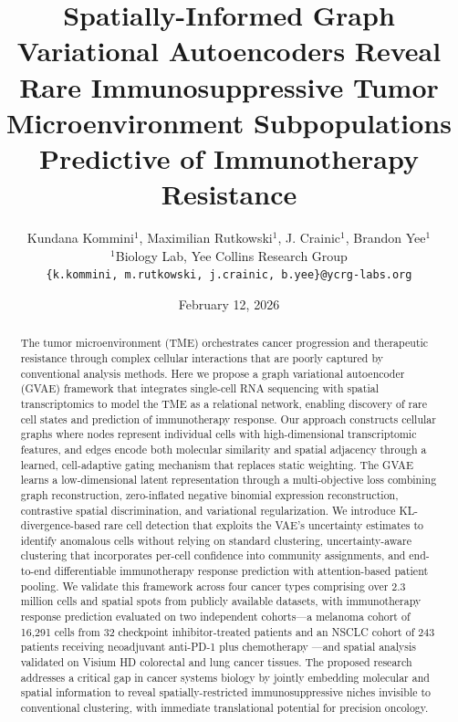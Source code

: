 \documentclass{article}
\title{Spatially-Informed Graph Variational Autoencoders Reveal Rare Immunosuppressive Tumor Microenvironment Subpopulations Predictive of Immunotherapy Resistance}
\author{
    Kundana Kommini$^{1}$, Maximilian Rutkowski$^{1}$, J. Crainic$^{1}$, Brandon Yee$^{1}$\\
    $^{1}$Biology Lab, Yee Collins Research Group\\
    \texttt{\{k.kommini, m.rutkowski, j.crainic, b.yee\}@ycrg-labs.org}
}
\date{February 12, 2026}
\begin{document}
\maketitle

\begin{abstract}
The tumor microenvironment (TME) orchestrates cancer progression and therapeutic resistance through complex cellular interactions that are poorly captured by conventional analysis methods. Here we propose a graph variational autoencoder (GVAE) framework that integrates single-cell RNA sequencing with spatial transcriptomics to model the TME as a relational network, enabling discovery of rare cell states and prediction of immunotherapy response. Our approach constructs cellular graphs where nodes represent individual cells with high-dimensional transcriptomic features, and edges encode both molecular similarity and spatial adjacency through a learned, cell-adaptive gating mechanism that replaces static weighting. The GVAE learns a low-dimensional latent representation through a multi-objective loss combining graph reconstruction, zero-inflated negative binomial expression reconstruction, contrastive spatial discrimination, and variational regularization. We introduce KL-divergence-based rare cell detection that exploits the VAE's uncertainty estimates to identify anomalous cells without relying on standard clustering, uncertainty-aware clustering that incorporates per-cell confidence into community assignments, and end-to-end differentiable immunotherapy response prediction with attention-based patient pooling. We validate this framework across four cancer types comprising over 2.3 million cells and spatial spots from publicly available datasets, with immunotherapy response prediction evaluated on two independent cohorts---a melanoma cohort of 16,291 cells from 32 checkpoint inhibitor-treated patients \citep{sadefeldman2018} and an NSCLC cohort of 243 patients receiving neoadjuvant anti-PD-1 plus chemotherapy \citep{deng2025nsclc}---and spatial analysis validated on Visium HD colorectal and lung cancer tissues. The proposed research addresses a critical gap in cancer systems biology by jointly embedding molecular and spatial information to reveal spatially-restricted immunosuppressive niches invisible to conventional clustering, with immediate translational potential for precision oncology.
\end{abstract}

\end{document}
